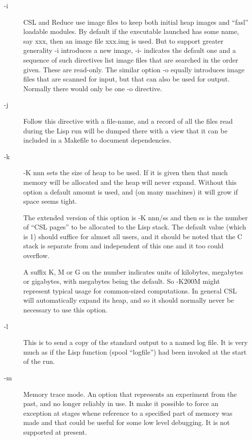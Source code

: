 \documentclass[a4paper,11pt]{article}
\begin{document}
\begin{description}
\item [{\ttfamily -i}]
CSL and Reduce use image files to keep both initial heap images and
``fasl'' loadable modules. By default if the executable launched has some name,
say xxx, then an image file xxx.img is used. But to support greater
generality {\ttfamily -i} introduces a new image, {\ttfamily -i-} indicates
the default one and a sequence of such directives list image files that are
searched in the order given. These are read-only. The similar option
{\ttfamily -o} equally introduces image files that are scanned for input, but
that can also be used for output. Normally there would only be one
{\ttfamily -o} directive.

\item [{\ttfamily -j}]
Follow this directive with a file-name, and a record of all the files read
during the Lisp run will be dumped there with a view that it can be included
in a Makefile to document dependencies.

\item [{\ttfamily -k}]
{\ttfamily -K nnn} sets the size of heap to be used.  If it is given then that much
memory will be allocated and the heap will never expand.  Without this
option a default amount is used, and (on many machines) it will grow
if space seems tight.
  
The extended version of this option is {\ttfamily -K nnn/ss} and then ss is the
number of ``CSL pages'' to be allocated to the Lisp stack. The default
value (which is 1) should suffice for almost all users, and it should
be noted that the C stack is separate from and independent of this one and
it too could overflow.
  
A suffix K, M or G on the number indicates units of kilobytes, megabytes or
gigabytes, with megabytes being the default. So {\ttfamily -K200M} might
represent typical usage for common-sized computations. In general CSL
will automatically expand its heap, and so it should normally never be
necessary to use this option.

\item [{\ttfamily -l}]
This is to send a copy of the standard output to a named log file. It is
very much as if the Lisp function {\ttfamily (spool ``logfile'')} had been
invoked at the start of the run.

\item [{\ttfamily -m}]
Memory trace mode. An option that represents an experiment from the past,
and no longer reliably in use. It make it possible to force an
exception at stages whene reference to a specified part of memory was made
and that could be useful for some low level debugging. It is not supported
at present.


\end{description}
\end{document}
